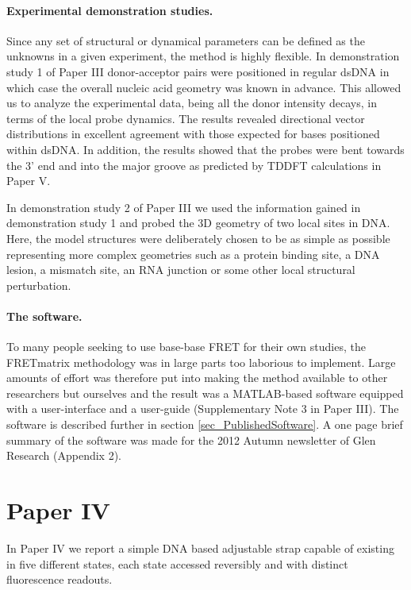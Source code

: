  \paragraph{Experimental demonstration studies.} Since any set of structural or dynamical parameters can be defined as the unknowns in a given experiment, the method is highly flexible. In demonstration study 1 of Paper III donor-acceptor pairs were positioned in regular dsDNA in which case the overall nucleic acid geometry was known in advance. This allowed us to analyze the experimental data, being all the donor intensity decays, in terms of the local probe dynamics. The results revealed directional vector distributions in excellent agreement with those expected for bases positioned within dsDNA. In addition, the results showed that the probes were bent towards the 3' end and into the major groove as predicted by TDDFT calculations in Paper V.

 In demonstration study 2 of Paper III we used the information gained in demonstration study 1 and probed the 3D geometry of two local sites in DNA. Here, the model structures were deliberately chosen to be as simple as possible representing more complex geometries such as a protein binding site, a DNA lesion, a mismatch site, an RNA junction or some other local structural perturbation.

 \paragraph{The software.} To many people seeking to use base-base FRET for their own studies, the FRETmatrix methodology was in large parts too laborious to implement. Large amounts of effort was therefore put into making the method available to other researchers but ourselves and the result was a MATLAB-based software equipped with a user-interface and a user-guide (Supplementary Note 3 in Paper III). The software is described further in section \ref{sec_PublishedSoftware}. A one page brief summary of the software was made for the 2012 Autumn newsletter of Glen Research (Appendix 2).

\section{Paper IV}
 In Paper IV we report a simple DNA based adjustable strap capable of existing in five different states, each state accessed reversibly and with distinct fluorescence readouts.

